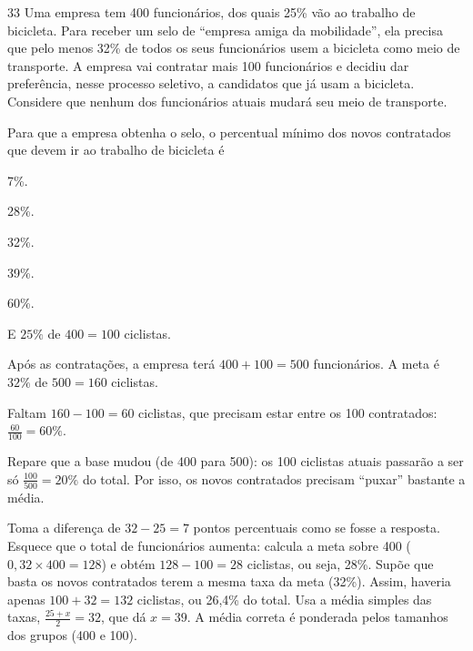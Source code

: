 \begin{questaoinedita}{3}{3}
Uma empresa tem 400 funcionários, dos quais 25\% vão ao trabalho de bicicleta.
Para receber um selo de ``empresa amiga da mobilidade'', ela precisa que pelo
menos 32\% de todos os seus funcionários usem a bicicleta como meio de
transporte. A empresa vai contratar mais 100 funcionários e decidiu dar
preferência, nesse processo seletivo, a candidatos que já usam a bicicleta.
Considere que nenhum dos funcionários atuais mudará seu meio de transporte.

Para que a empresa obtenha o selo, o percentual mínimo dos novos contratados
que devem ir ao trabalho de bicicleta é
\begin{alternativas*}[5]
  \item 7\%.
  \item 28\%.
  \item 32\%.
  \item 39\%.
  \item 60\%.
\end{alternativas*}
\end{questaoinedita}
\begin{resolucao}{E}
 $25\%$ de $400 = 100$ ciclistas.

 Após as contratações, a empresa terá
$400 + 100 = 500$ funcionários. A meta é $32\%$ de $500 = 160$ ciclistas.

 Faltam $160 - 100 = 60$ ciclistas, que
precisam estar entre os 100 contratados: $\frac{60}{100} = 60\%$.

 Repare que a base mudou (de 400 para 500): os 100
ciclistas atuais passarão a ser só $\frac{100}{500} = 20\%$ do total. Por isso,
os novos contratados precisam ``puxar'' bastante a média.

\begin{distratores}
 Toma a diferença de $32 - 25 = 7$ pontos percentuais como se fosse a
resposta.
 Esquece que o total de funcionários aumenta: calcula a meta sobre 400
($0{,}32\times 400 = 128$) e obtém $128 - 100 = 28$ ciclistas, ou seja, 28\%.
 Supõe que basta os novos contratados terem a mesma taxa da meta (32\%).
Assim, haveria apenas $100 + 32 = 132$ ciclistas, ou 26,4\% do total.
 Usa a média simples das taxas, $\frac{25 + x}{2} = 32$, que dá $x = 39$.
A média correta é ponderada pelos tamanhos dos grupos (400 e 100).
\end{distratores}
\end{resolucao}

